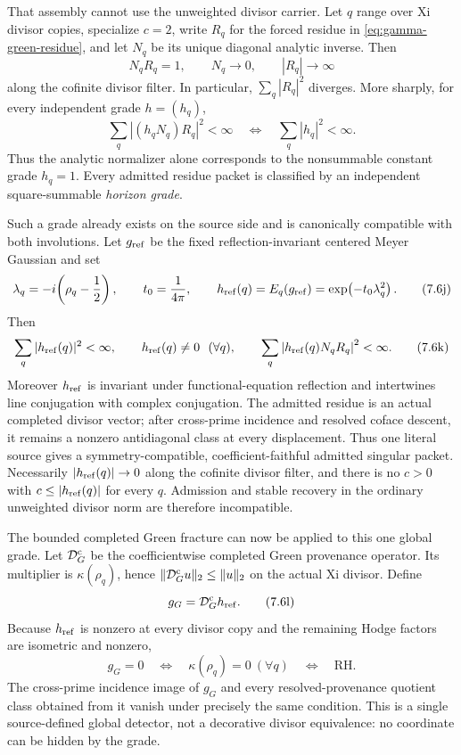 \documentclass[11pt]{article}
\theoremstyle{definition}
\theoremstyle{remark}
\begin{document}
That assembly cannot use the unweighted divisor carrier.  Let \(q\) range
over Xi divisor copies, specialize \(c=2\), write \(R_q\) for the forced
residue in \eqref{eq:gamma-green-residue}, and let \(N_q\) be its unique
diagonal analytic inverse.  Then
\[
 N_qR_q=1,\qquad N_q\longrightarrow0,\qquad
 |R_q|\longrightarrow\infty
\tag{7.6h}\label{eq:residue-nonadmission}
\]
along the cofinite divisor filter.  In particular,
\(\sum_q|R_q|^2\) diverges.  More sharply, for every independent grade
\(h=(h_q)\),
\[
 \sum_q |(h_qN_q)R_q|^2<\infty
 \quad\Longleftrightarrow\quad
 \sum_q|h_q|^2<\infty.
\tag{7.6i}\label{eq:horizon-grade-classification}
\]
Thus the analytic normalizer alone corresponds to the nonsummable constant
grade \(h_q=1\).  Every admitted residue packet is classified by an
independent square-summable \emph{horizon grade}.

Such a grade already exists on the source side and is canonically compatible
with both involutions.  Let \(g_{\rm ref}\) be the fixed
reflection-invariant centered Meyer Gaussian and set
\[
 \lambda_q=-i\!\left(\rho_q-\frac12\right),\qquad
 t_0=\frac1{4\pi},\qquad
 h_{\rm ref}(q)=E_q(g_{\rm ref})
               =\exp\!\left(-t_0\lambda_q^2\right).
\tag{7.6j}\label{eq:reflected-horizon-grade}
\]
Then
\[
 \sum_q|h_{\rm ref}(q)|^2<\infty,\qquad
 h_{\rm ref}(q)\ne0\ \ (\forall q),
 \qquad
 \sum_q\left|h_{\rm ref}(q)N_qR_q\right|^2<\infty.
\tag{7.6k}\label{eq:reflected-residue-admission}
\]
Moreover \(h_{\rm ref}\) is invariant under functional-equation reflection
and intertwines line conjugation with complex conjugation.  The admitted
residue is an actual completed divisor vector; after cross-prime incidence
and resolved coface descent, it remains a nonzero antidiagonal class at
every displacement.  Thus one literal source gives a symmetry-compatible,
coefficient-faithful admitted singular packet.  Necessarily
\(|h_{\rm ref}(q)|\to0\) along the cofinite divisor filter, and there is no
\(c>0\) with \(c\le |h_{\rm ref}(q)|\) for every \(q\).  Admission and
stable recovery in the ordinary unweighted divisor norm are therefore
incompatible.

The bounded completed Green fracture can now be applied to this one global
grade.  Let \(\mathcal D_G^{\rm c}\) be the coefficientwise completed Green
provenance operator.  Its multiplier is \(\kappa(\rho_q)\), hence
\(\|\mathcal D_G^{\rm c}u\|_2\le\|u\|_2\) on the actual Xi divisor.  Define
\[
                    g_G=\mathcal D_G^{\rm c}h_{\rm ref}.
\tag{7.6l}\label{eq:global-green-detector}
\]
Because \(h_{\rm ref}\) is nonzero at every divisor copy and the remaining
Hodge factors are isometric and nonzero,
\[
 g_G=0\quad\Longleftrightarrow\quad \kappa(\rho_q)=0\ (\forall q)
       \quad\Longleftrightarrow\quad\mathrm{RH}.
\tag{7.6m}\label{eq:global-green-rh}
\]
The cross-prime incidence image of \(g_G\) and every resolved-provenance
quotient class obtained from it vanish under precisely the same condition.
This is a single source-defined global detector, not a decorative divisor
equivalence: no coordinate can be hidden by the grade.
\end{document}
